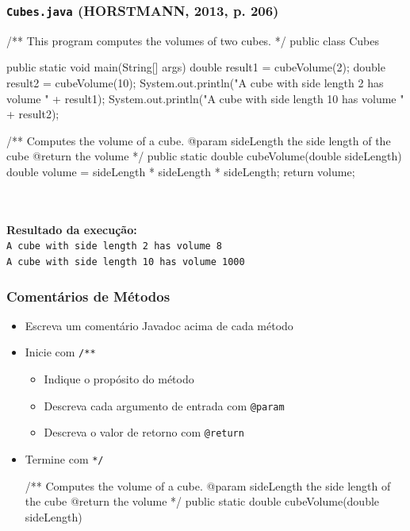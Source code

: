 \documentclass[xcolor={dvipsnames,table},aspectratio=169]{beamer}
\begin{document}
\begin{frame}[fragile]\frametitle{\texttt{Cubes.java} {\tiny (HORSTMANN, 2013, p. 206)}}
{\tiny
\begin{javacode}
/**
   This program computes the volumes of two cubes.
*/
public class Cubes {
   public static void main(String[] args) {
      double result1 = cubeVolume(2);
      double result2 = cubeVolume(10);
      System.out.println("A cube with side length 2 has volume " + result1);
      System.out.println("A cube with side length 10 has volume " + result2);
   }

   /**
      Computes the volume of a cube.
      @param sideLength the side length of the cube
      @return the volume
   */
   public static double cubeVolume(double sideLength) {
      double volume = sideLength * sideLength * sideLength;
      return volume;
   }
}
\end{javacode}
~\\
~\\
\textbf{Resultado da execução:}\\
\texttt{A cube with side length 2 has volume 8\\
A cube with side length 10 has volume 1000\\}
}
\end{frame}

\begin{frame}[fragile]\frametitle{Comentários de Métodos}
\begin{itemize}
	\item Escreva um comentário Javadoc acima de cada método
	\item Inicie com \texttt{/**}
	\begin{itemize}
		\item Indique o propósito do método
		\item Descreva cada argumento de entrada com \texttt{@param}
		\item Descreva o valor de retorno com \texttt{@return}
	\end{itemize}
	\item Termine com \texttt{*/}
\begin{javacode}
/**
  Computes the volume of a cube.
  @param sideLength the side length of the cube
  @return the volume
*/
public static double cubeVolume(double sideLength)
\end{javacode}
\end{itemize}
\end{frame}
\end{document}
